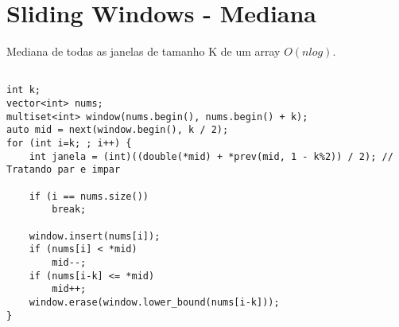 \section{Sliding Windows - Mediana}
Mediana de todas as janelas de tamanho K de um array $O(nlog)$.
\begin{multicols}{2}
	\begin{lstlisting}

int k;
vector<int> nums;
multiset<int> window(nums.begin(), nums.begin() + k);
auto mid = next(window.begin(), k / 2);
for (int i=k; ; i++) {	
	int janela = (int)((double(*mid) + *prev(mid, 1 - k%2)) / 2); // Tratando par e impar
	
	if (i == nums.size())
		break;
	
	window.insert(nums[i]);
	if (nums[i] < *mid)
		mid--;
	if (nums[i-k] <= *mid)
		mid++;
	window.erase(window.lower_bound(nums[i-k]));
}

\end{lstlisting}
\end{multicols}

